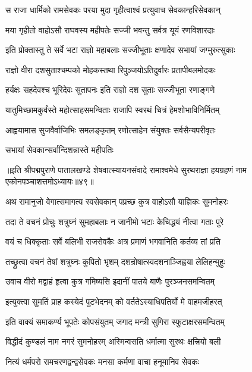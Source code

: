 \twolineshloka
{स राजा धार्मिको रामसेवकः परया मुदा}
{गृहीत्वाश्वं प्रत्युवाच सेवकान्हरिसेवकान्}%

\twolineshloka
{मया गृहीतो वाहोऽसौ राघवस्य महीपतेः}
{सज्जी भवन्तु सर्वत्र यूयं रणविशारदाः}%

\twolineshloka
{इति प्रोक्तास्तु ते सर्वे भटा राज्ञो महाबलाः}
{सज्जीभूताः क्षणादेव सभायां जग्मुरुत्सुकाः}%

\twolineshloka
{राज्ञो वीरा दशसुताश्चम्पको मोहकस्तथा}
{रिपुञ्जयोऽतिदुर्वारः प्रतापीबलमोदकः}%

\twolineshloka
{हर्यक्षः सहदेवश्च भूरिदेवः सुतापनः}
{इति राज्ञो दश सुताः सज्जीभूता रणाङ्गणे}%

\twolineshloka
{यातुमिच्छामकुर्वंस्ते महोत्साहसमन्विताः}
{राजापि स्वरथं चित्रं हेमशोभाविनिर्मितम्}%

\twolineshloka
{आह्वयामास सुजवैर्वाजिभिः समलङ्कृतम्}
{रणोत्साहेन संयुक्तः सर्वसैन्यपरीवृतः}%

\onelineshloka
{सभायां सेवकान्सर्वान्दिशन्नास्ते महीपतिः}%

॥इति श्रीपद्मपुराणे पातालखण्डे शेषवात्स्यायनसंवादे रामाश्वमेधे सुरथराज्ञा हयग्रहणं नाम एकोनपञ्चाशत्तमोऽध्यायः॥४९॥



\twolineshloka
{अथ रामानुजो वेगात्समागत्य स्वसेवकान्}
{पप्रच्छ कुत्र वाहोऽसौ याज्ञिकः सुमनोहरः}%

\twolineshloka
{तदा ते वचनं प्रोचुः शत्रुघ्नं सुमहाबलाः}
{न जानीमो भटाः केचिद्धयं नीत्वा गताः पुरे}%

\twolineshloka
{वयं च धिक्कृताः सर्वे बलिभी राजसेवकैः}
{अत्र प्रमाणं भगवानिति कर्तव्य तां प्रति}%

\twolineshloka
{तच्छ्रुत्वा वचनं तेषां शत्रुघ्नः कुपितो भृशम्}
{दशन्रोषात्स्वदशनाञ्जिह्वया लेलिहन्मुहुः}%

\twolineshloka
{उवाच वीरो मद्वाहं हृत्वा कुत्र गमिष्यसि}
{इदानीं पातये बाणैः पुरञ्जनसमन्वितम्}%

\twolineshloka
{इत्युक्त्वा सुमतिं प्राह कस्येदं पुटभेदनम्}
{को वर्ततेऽस्याधिपतिर्यो मे वाहमजीहरत्}%


\twolineshloka
{इति वाक्यं समाकर्ण्य भूपतेः कोपसंयुतम्}
{जगाद मन्त्री सुगिरा स्फुटाक्षरसमन्वितम्}%

\twolineshloka
{विद्धीदं कुण्डलं नाम नगरं सुमनोहरम्}
{अस्मिन्वसति धर्मात्मा सुरथः क्षत्त्रियो बली}%

\twolineshloka
{नित्यं धर्मपरो रामचरणद्वन्द्वसेवकः}
{मनसा कर्मणा वाचा हनूमानिव सेवकः}%

